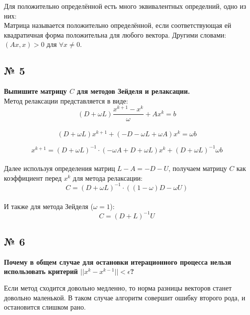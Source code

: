 \documentclass[a4paper, 14pt]{article}
\begin{document}
Для положительно определённой есть много эквивалентных определний, одно из них:\\
Матрица называется положительно определённой, если соответствующая ей квадратичная форма положительна для любого вектора. Другими словами: $(Ax, x)>0 $ для $\forall x \neq 0$.



\subsection*{№ 5}

\textbf{Выпишите матрицу $C$ для методов Зейделя и релаксации.}\\

Метод релаксации представляется в виде:\\
\begin{equation}
    (D+\omega L) \frac{x^{k+1} - x^{k}}{\omega} + Ax^k = b
\end{equation}
\\
\begin{equation}
    (D+\omega L) x^{k+1} + (-D-\omega L + \omega A) x^k = \omega b
\end{equation}
    

\begin{equation}
    x^{k+1} = (D+\omega L)^{-1} \cdot (-\omega A + D + \omega L)x^k + (D+\omega L)^{-1}\omega b
\end{equation}
\\ Далее используя определения матриц $L-A = -D -U$, получаем матрицу $C$ как коэффициент перед $x^k$ для метода релаксации: 
\begin{equation}
    C=(D+\omega L)^{-1} \cdot ((1-\omega)D-\omega U)
\end{equation}
\\И также для метода Зейделя ($\omega = 1$): 
\begin{equation}
    C=(D+ L)^{-1} U
\end{equation}



\subsection*{№ 6}

\textbf{Почему в общем случае для остановки итерационного процесса нельзя использовать критерий $\vert \vert x^k - x^{k-1} \vert \vert < \epsilon$?\\}

Если метод сходится довольно медленно, то норма разницы векторов станет довольно маленькой. В таком случае алгоритм совершит ошибку второго рода, и остановится слишком рано. \\
\end{document}
